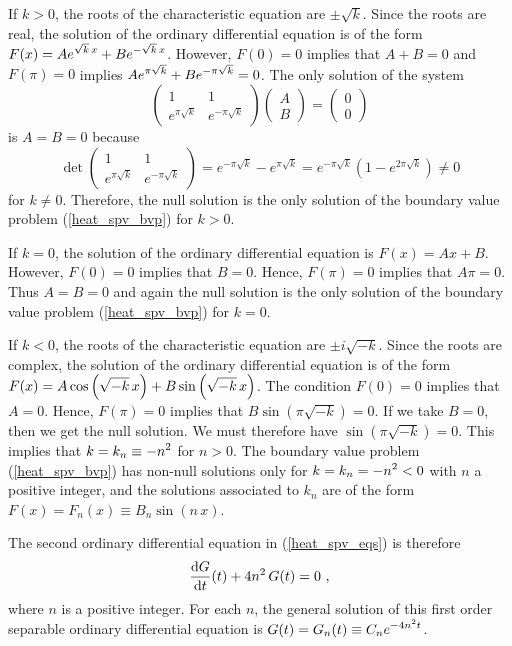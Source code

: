 \begin{egg}
If $k>0$, the roots of the characteristic equation are $\pm \sqrt{k}$.
Since the roots are real, the solution of the ordinary differential
equation is of the form $\displaystyle
F(x) = A e^{\sqrt{k}\,x} + B e^{-\sqrt{k}\, x}$.
However, $F(0)=0$ implies that $A+B=0$ and $F(\pi)=0$ implies
$\displaystyle A e^{\pi\sqrt{k}} + B e^{-\pi\sqrt{k}} = 0$.  The only
solution of the system
\[
\begin{pmatrix}
1 & 1 \\ e^{\pi\sqrt{k}} & e^{-\pi\sqrt{k}}
\end{pmatrix}
\begin{pmatrix}
A \\ B
\end{pmatrix}
=
\begin{pmatrix}
0 \\ 0 
\end{pmatrix}
\]
is $A=B=0$ because
\[
\det
\begin{pmatrix}
1 & 1 \\ e^{\pi\sqrt{k}} & e^{-\pi\sqrt{k}}
\end{pmatrix}
= e^{-\pi\sqrt{k}} - e^{\pi\sqrt{k}} 
= e^{-\pi\sqrt{k}}\left(1 - e^{2\pi\sqrt{k}}\right) \neq 0
\]
for $k\neq 0$.  Therefore, the null solution is the only solution
of the boundary value problem (\ref{heat_spv_bvp}) for $k>0$.

If $k=0$, the solution of the ordinary differential equation is $F(x)=Ax+B$.
However, $F(0)=0$ implies that $B=0$.  Hence, $F(\pi)=0$ implies
that $A\pi = 0$.  Thus $A=B=0$ and again the null solution is the
only solution of the boundary value problem (\ref{heat_spv_bvp}) for $k=0$.

If $k<0$, the roots of the characteristic equation are $\pm i \sqrt{-k}$.
Since the roots are complex, the solution of the ordinary differential
equation is of the form $\displaystyle
F(x) = A \cos\left(\sqrt{-k}\,x\right) + B \sin\left(\sqrt{-k}\,x\right)$.
The condition $F(0)=0$ implies that $A=0$.  Hence, $F(\pi)=0$ implies that
$B \sin\left(\pi\sqrt{-k}\right) = 0$.  If we take
$B=0$, then we get the null solution.  We must therefore have
$\sin\left(\pi\sqrt{-k}\right) = 0$.  This implies that
$\displaystyle k = k_n \equiv -n^2$ for $n>0$.  The boundary value problem
(\ref{heat_spv_bvp}) has non-null solutions only for
$\displaystyle k=k_n=-n^2<0$
with $n$ a positive integer, and the solutions associated to $k_n$ are of
the form $F(x)=F_n(x) \equiv B_n \sin(n\,x)$.

The second ordinary differential equation in (\ref{heat_spv_eqs}) is
therefore
\[
\frac{\mathrm{d}G}{\mathrm{d}{t}}(t) + 4n^2\,G(t) = 0 \  ,
\]
where $n$ is a positive integer.  For each $n$, the general solution
of this first order separable ordinary differential equation is
$\displaystyle G(t) = G_n(t) \equiv C_n e^{-4n^2t}$.


\end{egg}
